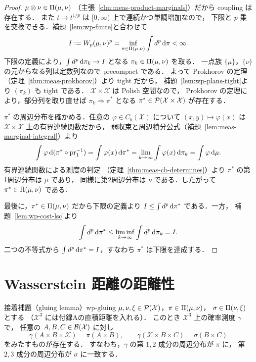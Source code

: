 \begin{proof}
  $\mu\otimes\nu\in\Pi(\mu,\nu)$
  （主張~\ref{clm:meas-product-marginals}）だから coupling は存在する．
  また $t\mapsto t^{1/p}$ は $[0,\infty)$ 上で連続かつ単調増加なので，
  下限と $p$ 乗を交換できる．補題~\ref{lem:wp-finite}と合わせて
  \[
    I:=W_p(\mu,\nu)^p
    =\inf_{\pi\in\Pi(\mu,\nu)}\int d^p\,\mathrm{d}\pi<\infty.
  \]
  下限の定義により，$\int d^p\,\mathrm{d}\pi_k\to I$ となる
  $\pi_k\in\Pi(\mu,\nu)$ を取る．
  一点族 $\{\mu\}$，$\{\nu\}$ の元からなる列は定数列なので precompact である．
  よって Prokhorov の定理
  （定理~\ref{thm:meas-prokhorov}）より tight だから，
  補題~\ref{lem:wp-plans-tight}より $(\pi_k)$ も tight である．
  $\mathcal{X}\times\mathcal{X}$ は Polish 空間なので，
  Prokhorov の定理により，部分列を取り直せば
  $\pi_k\Rightarrow\pi^*$ となる $\pi^*\in\mathcal{P}(\mathcal{X}\times\mathcal{X})$
  が存在する．

  $\pi^*$ の周辺分布を確かめる．任意の $\varphi\in C_b(\mathcal{X})$ について
  $(x,y)\mapsto\varphi(x)$ は $\mathcal{X}\times\mathcal{X}$ 上の有界連続関数だから，
  弱収束と周辺積分公式（補題~\ref{lem:meas-marginal-integral}）より
  \[
    \int\varphi\,\mathrm{d}(\pi^*\circ\mathrm{pr}_1^{-1})
    =\int\varphi(x)\,\mathrm{d}\pi^*
    =\lim_{k\to\infty}\int\varphi(x)\,\mathrm{d}\pi_k
    =\int\varphi\,\mathrm{d}\mu.
  \]
  有界連続関数による測度の判定
  （定理~\ref{thm:meas-cb-determines}）より $\pi^*$ の第1周辺分布は $\mu$ であり，
  同様に第2周辺分布は $\nu$ である．したがって
  $\pi^*\in\Pi(\mu,\nu)$ である．

  最後に，$\pi^*\in\Pi(\mu,\nu)$ だから下限の定義より
  $I\leq\int d^p\,\mathrm{d}\pi^*$ である．一方，
  補題~\ref{lem:wp-cost-lsc}より
  \[
    \int d^p\,\mathrm{d}\pi^*
    \leq\liminf_{k\to\infty}\int d^p\,\mathrm{d}\pi_k=I.
  \]
  二つの不等式から $\int d^p\,\mathrm{d}\pi^*=I$，すなわち $\pi^*$ は下限を達成する．
\end{proof}

\section{Wasserstein 距離の距離性}
\label{sec:metric-property}

\begin{lemma}{接着補題（gluing lemma）}{wp-gluing}
  $\mu,\nu,\xi\in\mathcal{P}(\mathcal{X})$，$\pi\in\Pi(\mu,\nu)$，
  $\sigma\in\Pi(\nu,\xi)$ とする
  （$\mathcal{X}^3$ には付録Aの直積距離を入れる）．
  このとき $\mathcal{X}^3$ 上の確率測度 $\gamma$ で，
  任意の $A,B,C\in\mathcal{B}(\mathcal{X})$ に対し
  \[
    \gamma(A\times B\times \mathcal{X})=\pi(A\times B),
    \qquad
    \gamma(\mathcal{X}\times B\times C)=\sigma(B\times C)
  \]
  をみたすものが存在する．
  すなわち，$\gamma$ の第 $1,2$ 成分の周辺分布が $\pi$ に，
  第 $2,3$ 成分の周辺分布が $\sigma$ に一致する．
\end{lemma}

